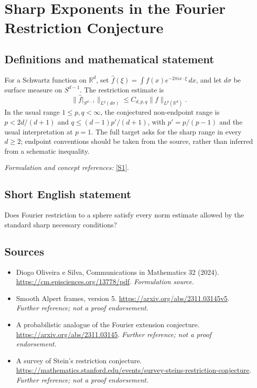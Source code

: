 \documentclass[11pt]{article}
\begin{document}
\section*{\texorpdfstring{Sharp Exponents in the Fourier Restriction Conjecture}{Sharp Exponents in the Fourier Restriction Conjecture}}\label{30003539}
\subsection{Definitions and mathematical statement}
For a Schwartz function on ${\mathbb{R}}^d$, set $\widehat f(\xi)=\int f(x)e^{-2\pi i x\cdot\xi}\,dx$, and let $d\sigma$ be surface measure on $S^{d-1}$. The restriction estimate is
\[
 \|\widehat f|_{S^{d-1}}\|_{L^q(d\sigma)}\le C_{d,p,q}\|f\|_{L^p({\mathbb{R}}^d)}.
\]
In the usual range $1\le p,q<\infty$, the conjectured non-endpoint range is $p<2d/(d+1)$ and $q\le (d-1)p'/(d+1)$, with $p'=p/(p-1)$ and the usual interpretation at $p=1$. The full target asks for the sharp range in every $d\ge2$; endpoint conventions should be taken from the source, rather than inferred from a schematic inequality.
\par\smallskip\textit{Formulation and concept references:} \href{https://cm.episciences.org/13778/pdf}{[S1]}.

\subsection{Short English statement}
Does Fourier restriction to a sphere satisfy every norm estimate allowed by the standard sharp necessary conditions?
\subsection{Sources}
\begin{itemize}
\item[S1]Diogo Oliveira e Silva, Communications in Mathematics 32 (2024).
\url{https://cm.episciences.org/13778/pdf}.
\textit{Formulation source.}
\item[S2]Smooth Alpert frames, version 5.
\url{https://arxiv.org/abs/2311.03145v5}.
\textit{Further reference; not a proof endorsement.}
\item[S3]A probabilistic analogue of the Fourier extension conjecture.
\url{https://arxiv.org/abs/2311.03145}.
\textit{Further reference; not a proof endorsement.}
\item[S4]A survey of Stein's restriction conjecture.
\url{https://mathematics.stanford.edu/events/survey-steins-restriction-conjecture}.
\textit{Further reference; not a proof endorsement.}
\end{itemize}
\end{document}

